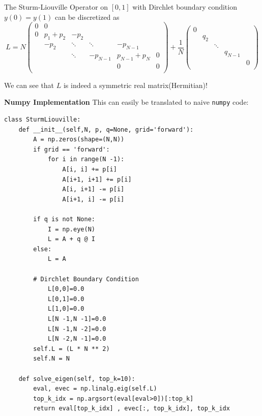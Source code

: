 \begin{proposition}The Sturm-Liouville Operator on $[0,1]$ with Dirchlet boundary condition $y(0)=y(1)$ can be discretized as
\begin{equation}
\label{discreteSL}
L=N\begin{pmatrix}
0 &0 & & &  &\\
0 &p_1+p_2 & -p_2& & & \\
&-p_2&  \ddots &\ddots & -p_{N-1}& \\
& & \ddots &-p_{N-1} & p_{N-1}+p_N &0 \\
& & & &0 & 0\\
\end{pmatrix} 
+ 
\frac{1}{N}\begin{pmatrix}0 & & & & \\
& q_2 & & & \\
&  & \ddots& & \\
& & & q_{N-1} & \\
& &  & & 0  \\
\end{pmatrix}
\end{equation}

\end{proposition}We can see that $L$ is indeed a symmetric real matrix(Hermitian)!

\textbf{Numpy Implementation}
This can easily be translated to naive \texttt{numpy} code:

\begin{verbatim}
class SturmLiouville:
    def __init__(self,N, p, q=None, grid='forward'):
        A = np.zeros(shape=(N,N))
        if grid == 'forward':
            for i in range(N -1):
                A[i, i] += p[i]
                A[i+1, i+1] += p[i]
                A[i, i+1] -= p[i]
                A[i+1, i] -= p[i]

        if q is not None:
            I = np.eye(N) 
            L = A + q @ I
        else:
            L = A
        
        # Dirchlet Boundary Condition
            L[0,0]=0.0
            L[0,1]=0.0
            L[1,0]=0.0
            L[N -1,N -1]=0.0
            L[N -1,N -2]=0.0
            L[N -2,N -1]=0.0
        self.L = (L * N ** 2)
        self.N = N

    def solve_eigen(self, top_k=10):
        eval, evec = np.linalg.eig(self.L)
        top_k_idx = np.argsort(eval[eval>0])[:top_k]
        return eval[top_k_idx] , evec[:, top_k_idx], top_k_idx
\end{verbatim}

